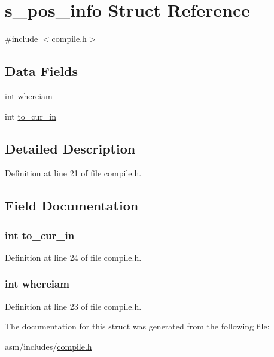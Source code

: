 \hypertarget{structs__pos__info}{\section{s\-\_\-pos\-\_\-info Struct Reference}
\label{structs__pos__info}
}


{\ttfamily \#include $<$compile.\-h$>$}

\subsection*{Data Fields}
\begin{DoxyCompactItemize}
\item 
int \hyperlink{structs__pos__info_a3d2291cda4e654eefa396b1bc08e0a67}{whereiam}
\item 
int \hyperlink{structs__pos__info_a6a372b8459e7ab7a3f7dadc86300eeca}{to\-\_\-cur\-\_\-in}
\end{DoxyCompactItemize}


\subsection{Detailed Description}


Definition at line 21 of file compile.\-h.



\subsection{Field Documentation}
\hypertarget{structs__pos__info_a6a372b8459e7ab7a3f7dadc86300eeca}{
\subsubsection[{to\-\_\-cur\-\_\-in}]{\setlength{\rightskip}{0pt plus 5cm}int to\-\_\-cur\-\_\-in}}\label{structs__pos__info_a6a372b8459e7ab7a3f7dadc86300eeca}


Definition at line 24 of file compile.\-h.

\hypertarget{structs__pos__info_a3d2291cda4e654eefa396b1bc08e0a67}{
\subsubsection[{whereiam}]{\setlength{\rightskip}{0pt plus 5cm}int whereiam}}\label{structs__pos__info_a3d2291cda4e654eefa396b1bc08e0a67}


Definition at line 23 of file compile.\-h.



The documentation for this struct was generated from the following file\-:\begin{DoxyCompactItemize}
\item 
asm/includes/\hyperlink{compile_8h}{compile.\-h}\end{DoxyCompactItemize}

